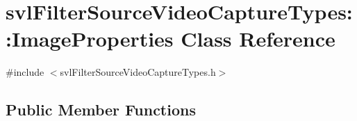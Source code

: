 \hypertarget{classsvl_filter_source_video_capture_types_1_1_image_properties}{\section{svl\-Filter\-Source\-Video\-Capture\-Types\-:\-:Image\-Properties Class Reference}
\label{classsvl_filter_source_video_capture_types_1_1_image_properties}
}


{\ttfamily \#include $<$svl\-Filter\-Source\-Video\-Capture\-Types.\-h$>$}

\subsection*{Public Member Functions}
